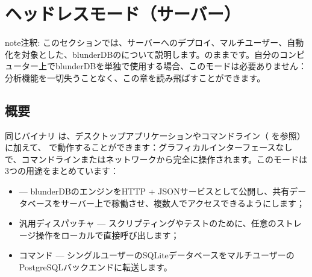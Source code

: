 \documentclass[letterpaper,10pt,dvipdfmx]{sphinxmanual}
\begin{document}
\sphinxstepscope


\section{ヘッドレスモード（サーバー）}
\label{\detokenize{mode_headless:mode-headless-serveur}}\label{\detokenize{mode_headless:headless}}\label{\detokenize{mode_headless::doc}}
\begin{sphinxadmonition}{note}{注釈:}
\sphinxAtStartPar
このセクションでは、サーバーへのデプロイ、マルチユーザー、自動化を対象とした、blunderDBのについて説明します。のままです。自分のコンピューター上でblunderDBを単独で使用する場合、このモードは必要ありません：分析機能を一切失うことなく、この章を読み飛ばすことができます。
\end{sphinxadmonition}


\subsection{概要}
\label{\detokenize{mode_headless:vue-d-ensemble}}
\sphinxAtStartPar
同じバイナリ  は、デスクトップアプリケーションやコマンドライン（{\hyperref[\detokenize{cli:cli}]{}} を参照）に加えて、 で動作することができます：グラフィカルインターフェースなしで、コマンドラインまたはネットワークから完全に操作されます。このモードは3つの用途をまとめています：
\begin{itemize}
\item {} 
\sphinxAtStartPar
{}  — blunderDBのエンジンをHTTP + JSONサービスとして公開し、共有データベースをサーバー上で稼働させ、複数人でアクセスできるようにします；

\item {} 
\sphinxAtStartPar
汎用ディスパッチャ  — スクリプティングやテストのために、任意のストレージ操作をローカルで直接呼び出します；

\item {} 
\sphinxAtStartPar
{} コマンド — シングルユーザーのSQLiteデータベースをマルチユーザーのPostgreSQLバックエンドに転送します。

\end{itemize}
\end{document}
